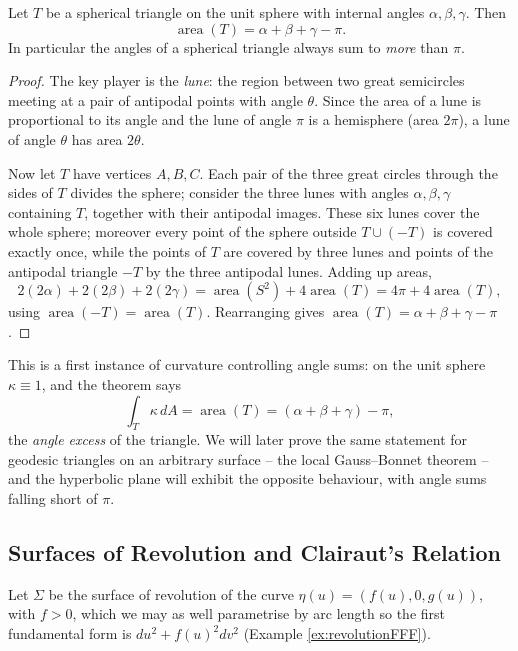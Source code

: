 \documentclass[a4paper]{scrartcl}
\begin{document}
\begin{theorem}\label{thm:sphericalGB}
    Let $T$ be a spherical triangle on the unit sphere with internal angles $\alpha, \beta, \gamma$. Then
    $$
    \operatorname{area}(T) = \alpha + \beta + \gamma - \pi.
    $$
    In particular the angles of a spherical triangle always sum to \emph{more} than $\pi$.
\end{theorem}
\begin{proof}
    The key player is the \emph{lune}: the region between two great semicircles meeting at a pair of antipodal points with angle $\theta$. Since the area of a lune is proportional to its angle and the lune of angle $\pi$ is a hemisphere (area $2\pi$), a lune of angle $\theta$ has area $2\theta$.

    Now let $T$ have vertices $A, B, C$. Each pair of the three great circles through the sides of $T$ divides the sphere; consider the three lunes with angles $\alpha, \beta, \gamma$ containing $T$, together with their antipodal images. These six lunes cover the whole sphere; moreover every point of the sphere outside $T \cup (-T)$ is covered exactly once, while the points of $T$ are covered by three lunes and points of the antipodal triangle $-T$ by the three antipodal lunes. Adding up areas,
    $$
    2(2\alpha) + 2(2\beta) + 2(2\gamma) = \operatorname{area}(S^2) + 4\operatorname{area}(T) = 4\pi + 4\operatorname{area}(T),
    $$
    using $\operatorname{area}(-T) = \operatorname{area}(T)$. Rearranging gives $\operatorname{area}(T) = \alpha + \beta + \gamma - \pi$.
\end{proof}

This is a first instance of curvature controlling angle sums: on the unit sphere $\kappa \equiv 1$, and the theorem says
$$
\int_T \kappa \, dA = \operatorname{area}(T) = (\alpha + \beta + \gamma) - \pi,
$$
the \emph{angle excess} of the triangle. We will later prove the same statement for geodesic triangles on an arbitrary surface -- the local Gauss--Bonnet theorem -- and the hyperbolic plane will exhibit the opposite behaviour, with angle sums falling short of $\pi$.

\subsection{Surfaces of Revolution and Clairaut's Relation}

Let $\Sigma$ be the surface of revolution of the curve $\eta(u) = (f(u), 0, g(u))$, with $f > 0$, which we may as well parametrise by arc length so the first fundamental form is $du^2 + f(u)^2 dv^2$ (Example \ref{ex:revolutionFFF}).
\end{document}
